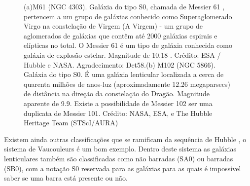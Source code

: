 \begin{figure}[ht!] 
\centering 
{} 
\qquad 
{} 
\caption{(a)M61 (NGC 4303). Galáxia do tipo S0, chamada de Messier 61 , pertencem a um grupo de galáxias conhecido como Superaglomerado Virgo na constelação de Virgem (A Virgem) - um grupo de aglomerados de galáxias que contêm até 2000 galáxias espirais e elípticas no total. O Messier 61 é um tipo de galáxia conhecida como galáxia de explosão estelar. Magnitude de 10.18 . Crédito: ESA / Hubble e NASA. Agradecimento: Det58.\newline (b) M102 (NGC 5866). Galáxia do tipo S0. É uma galáxia lenticular localizada a cerca de quarenta milhões de anos-luz (aproximadamente 12.26 megaparsecs) de distância na direção da constelação do Dragão. Magnitude aparente de 9.9. Existe a possibilidade de Messier 102 ser uma duplicata de Messier 101. Crédito: NASA, ESA, e The Hubble Heritage Team (STScI/AURA)} 
\label{fig:galáxiasElipticas4} 
\end{figure} 

Existem ainda outras classificações que se ramificam da sequência de Hubble \cite{bergh1998galaxy}, o sistema de Vaucouleurs \cite{1959HDP....53..275D} é um bom exemplo. Dentro deste sistema as galáxias lenticulares também são classificadas como não barradas (SA0) ou barradas (SB0), com a notação S0 reservada para as galáxias para as quais é impossível saber se uma barra está presente ou não.  

